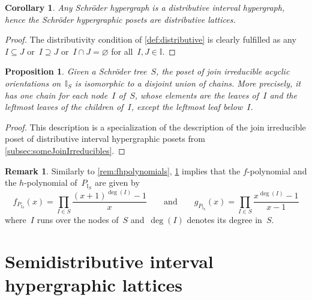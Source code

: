 \documentclass{amsart}
\newtheorem{corollary}[theorem]{Corollary}
\newtheorem{proposition}[theorem]{Proposition}
\theoremstyle{definition}
\newtheorem{remark}[theorem]{Remark}
\newcommand{\II}{\mathbb I} %
\begin{document}
\begin{corollary}
Any Schr\"oder hypergraph is a distributive interval hypergraph, hence the Schr\"oder hypergraphic posets are distributive lattices.
\end{corollary}

\begin{proof}
The distributivity condition of \cref{def:distributive} is clearly fulfilled as any~$I \subseteq J$ or~$I \supseteq J$ or~$I \cap J = \varnothing$ for all~$I,J \in \II$.
\end{proof}

\begin{proposition}
\label{prop:schroder}
Given a Schr\"oder tree~$S$, the poset of join irreducible acyclic orientations on~$\II_S$ is isomorphic to a disjoint union of chains.
More precisely, it has one chain for each node~$I$ of~$S$, whose elements are the leaves of~$I$ and the leftmost leaves of the children of~$I$, except the leftmost leaf below~$I$.
\end{proposition}

\begin{proof}
This description is a specialization of the description of the join irreducible poset of distributive interval hypergraphic posets from \cref{subsec:someJoinIrreducibles}.
\end{proof}

\begin{remark}
Similarly to \cref{rem:fhpolynomials}, \cref{prop:schroder} implies that the $f$-polynomial and the $h$-polynomial of~$P_{\II_S}$ are given by
\[
f_{P_{\II_S}}(x) = \prod_{I \in S} \frac{(x+1)^{\deg(I)}-1}{x}
\qquad\text{and}\qquad
g_{P_{\II_S}}(x) = \prod_{I \in S} \frac{x^{\deg(I)}-1}{x-1}
\]
where~$I$ runs over the nodes of~$S$ and~$\deg(I)$ denotes its degree in~$S$.
\end{remark}


\section{Semidistributive interval hypergraphic lattices}
\label{sec:semidistributive}
\end{document}
